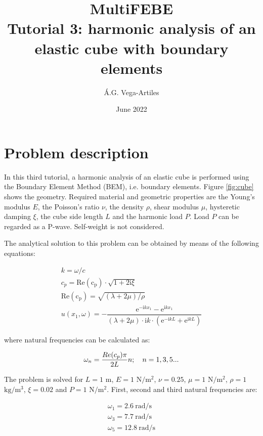 \documentclass[a4]{article}
\title{MultiFEBE \\ Tutorial 3: harmonic analysis of an elastic cube with boundary elements}
\author{\'A.G. Vega-Artiles}
\date{June 2022}
\begin{document}
\maketitle

\tableofcontents 

\section{Problem description}

In this third tutorial, a harmonic analysis of an elastic cube is performed using the Boundary Element Method (BEM), i.e. boundary elements. Figure \ref{fig:cube} shows the geometry. Required material and geometric properties are the Young's modulus $E$, the Poisson's ratio  $\nu$, the density $\rho$, shear modulus $\mu$, hysteretic damping $\xi$, the cube side length $L$ and the harmonic load $P$. Load $P$ can be regarded as a P-wave. Self-weight is not considered. 

The analytical solution to this problem can be obtained by means of the following equations:

\begin{equation}
	\begin{array}{l}
		k = \omega/c \\
		c_p = \mathrm{Re(c_p)}\cdot\sqrt{1+2\mathrm{i}\xi} \\
		\mathrm{Re(c_p)} = \sqrt{(\lambda+2\mu)/\rho} \\
		u(x_1,\omega) = - \dfrac{\mathrm{e}^{-\mathrm{i}kx_1}-\mathrm{e}^{\mathrm{i}kx_1}}{(\lambda+2\mu)\cdot\mathrm{i}k\cdot(\mathrm{e}^{-\mathrm{i}kL}+\mathrm{e}^{\mathrm{i}kL})}
	\end{array}
\end{equation}

where natural frequencies can be calculated as:

\begin{equation}
	\centering
	\omega_n=\frac{Re(c_p)\pi}{2L}n;\quad n=1,3,5...
\end{equation}

The problem is solved for $L=1$ $\mathrm{m}$, $E=1$ $\mathrm{N/m^2}$, $\nu=0.25$, $\mu=1$ $\mathrm{N/m^2}$, $\rho=1$ $\mathrm{kg/m^3}$, $\xi=0.02$ and $P=1$ $\mathrm{N/m^2}$. First, second and third natural frequencies are: 

\begin{equation}
	\begin{array}{l}
		\omega_1 = 2.6 \medspace \mathrm{rad/s} \\
		\omega_3 = 7.7 \medspace \mathrm{rad/s} \\
		\omega_5 = 12.8 \medspace \mathrm{rad/s}
	\end{array}
\end{equation}
\end{document}
